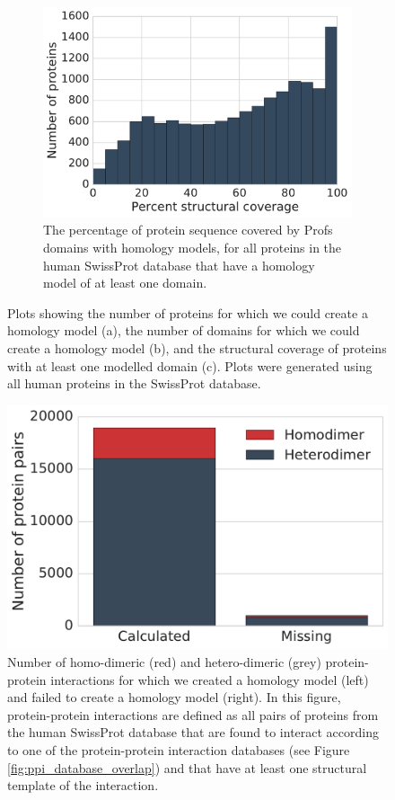 \begin{figure}[!tb]
	\begin{subfigure}{0.55\textwidth}
		\centering
		\includegraphics[width=1\linewidth]{static/elaspic_training_set/elaspic_statistics/structural_coverage_hist.pdf}
		\caption{The percentage of protein sequence covered by Profs domains with homology models, for all proteins in the human SwissProt database that have a homology model of at least one domain.}
		\label{fig:structural_coverage_hist}
	\end{subfigure}
	\vspace*{5mm}

	\caption[Precalculated homology models of human proteins.]{Plots showing the number of proteins for which we could create a homology model (a), the number of domains for which we could create a homology model (b), and the structural coverage of proteins with at least one modelled domain (c). Plots were generated using all human proteins in the SwissProt database.}
	\label{fig:elaspic_precalculated_core}
\end{figure}


\begin{figure}[!tb]
	\centering
	\includegraphics[width=0.5\linewidth]{static/elaspic_training_set/elaspic_statistics/missing_model_protein_pair_novarsplice.pdf}
	\caption[Precalculated homology models of human protein-protein interactions.]{Number of homo-dimeric (red) and hetero-dimeric (grey) protein-protein interactions for which we created a homology model (left) and failed to create a homology model (right). In this figure, protein-protein interactions are defined as all pairs of proteins from the human SwissProt database that are found to interact according to one of the protein-protein interaction databases (see Figure \ref{fig:ppi_database_overlap}) and that have at least one structural template of the interaction.}
	\label{fig:elaspic_precalculated_interface}
\end{figure}
